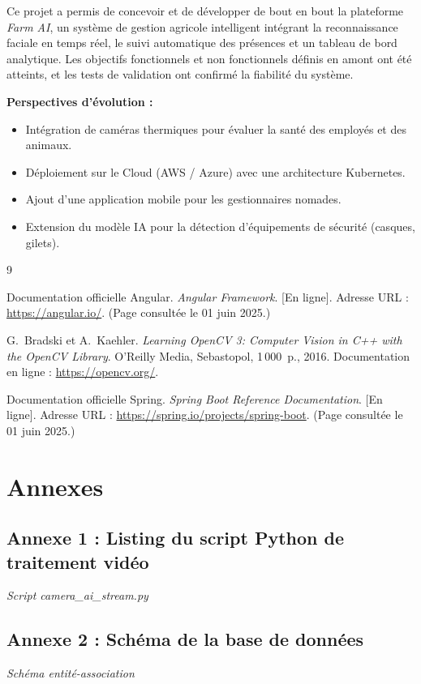 \documentclass[12pt,a4paper]{report}
\begin{document}
Ce projet a permis de concevoir et de développer de bout en bout la plateforme \textit{Farm AI},
un système de gestion agricole intelligent intégrant la reconnaissance faciale en temps réel, le
suivi automatique des présences et un tableau de bord analytique. Les objectifs fonctionnels et
non fonctionnels définis en amont ont été atteints, et les tests de validation ont confirmé la
fiabilité du système.

\textbf{Perspectives d'évolution :}
\begin{itemize}
  \item Intégration de caméras thermiques pour évaluer la santé des employés et des animaux.
  \item Déploiement sur le Cloud (AWS / Azure) avec une architecture Kubernetes.
  \item Ajout d'une application mobile pour les gestionnaires nomades.
  \item Extension du modèle IA pour la détection d'équipements de sécurité (casques, gilets).
\end{itemize}

\begin{thebibliography}{9}

Documentation officielle Angular.
\textit{Angular Framework}.
[En ligne]. Adresse URL : \url{https://angular.io/}.
(Page consultée le 01 juin 2025.)

G.~Bradski et A.~Kaehler.
\textit{Learning OpenCV 3: Computer Vision in C++ with the OpenCV Library}.
O'Reilly Media, Sebastopol, 1\,000~p., 2016.
Documentation en ligne : \url{https://opencv.org/}.

Documentation officielle Spring.
\textit{Spring Boot Reference Documentation}.
[En ligne]. Adresse URL : \url{https://spring.io/projects/spring-boot}.
(Page consultée le 01 juin 2025.)

\end{thebibliography}

\appendix
\chapter*{Annexes}

\section*{Annexe 1 : Listing du script Python de traitement vidéo}
\textit{Script camera\_ai\_stream.py}

\section*{Annexe 2 : Schéma de la base de données}
\textit{Schéma entité-association}
\end{document}
